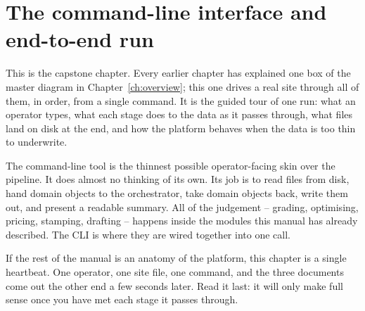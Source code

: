 \chapter{The command-line interface and end-to-end run}
\label{ch:cli}

This is the capstone chapter. Every earlier chapter has explained one box of the master diagram in Chapter~\ref{ch:overview}; this one drives a real site through all of them, in order, from a single command. It is the guided tour of one run: what an operator types, what each stage does to the data as it passes through, what files land on disk at the end, and how the platform behaves when the data is too thin to underwrite.

The command-line tool is the thinnest possible operator-facing skin over the pipeline. It does almost no thinking of its own. Its job is to read files from disk, hand domain objects to the orchestrator, take domain objects back, write them out, and present a readable summary. All of the judgement -- grading, optimising, pricing, stamping, drafting -- happens inside the modules this manual has already described. The CLI is where they are wired together into one call.

\begin{plainnote}
If the rest of the manual is an anatomy of the platform, this chapter is a single heartbeat. One operator, one site file, one command, and the three documents come out the other end a few seconds later. Read it last: it will only make full sense once you have met each stage it passes through.
\end{plainnote}


